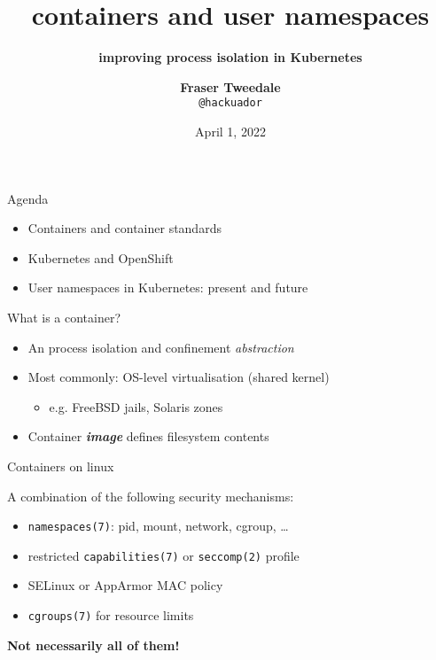 \documentclass[ignorenonframetext,aspectratio=169,12pt]{beamer}
\title{\bf containers and user namespaces}
\subtitle{\bf improving process isolation in Kubernetes}
\author{{\bf Fraser Tweedale}\\
    \texttt{@hackuador}\\
    \bigskip
    \def\svgwidth{4cm}
    }
\date{April 1, 2022}
\begin{document}
\frame{\titlepage}

\begin{frame}{Agenda}
\protect\hypertarget{agenda}{}

\begin{itemize}
    \item Containers and container standards
    \item Kubernetes and OpenShift
    \item User namespaces in Kubernetes: present and future
\end{itemize}

\end{frame}


\begin{frame}{What is a container?}
\protect\hypertarget{container-definition}{}

\begin{itemize}
    \item An process isolation and confinement {\em abstraction}
    \item Most commonly: OS-level virtualisation (shared kernel)
        \begin{itemize}
        \item e.g. FreeBSD jails, Solaris zones
        \end{itemize}
    \item Container \emph{\textbf{image}} defines filesystem contents
\end{itemize}

\end{frame}


\begin{frame}{Containers on linux}
\protect\hypertarget{container-linux}{}

  A combination of the following security mechanisms:

\begin{itemize}
  \item {\tt namespaces(7)}: pid, mount, network, cgroup, \ldots{}
  \item restricted \texttt{capabilities(7)} or \texttt{seccomp(2)} profile
  \item SELinux or AppArmor MAC policy
  \item \texttt{cgroups(7)} for resource limits
\end{itemize}

\textbf{Not necessarily all of them!}

\end{frame}
\end{document}
